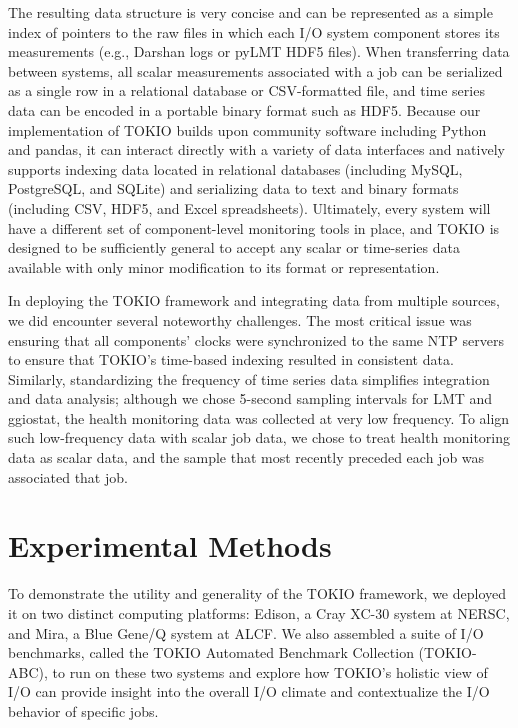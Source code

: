 The resulting data structure is very concise and can be represented as a simple index of pointers to the raw files in which each I/O system component stores its measurements (e.g., Darshan logs or pyLMT HDF5 files).
When transferring data between systems, all scalar measurements associated with a job can be serialized as a single row in a relational database or CSV-formatted file, and time series data can be encoded in a portable binary format such as HDF5.
Because our implementation of TOKIO builds upon community software including Python and pandas, it can interact directly with a variety of data interfaces and
natively supports indexing data located in relational databases (including MySQL, PostgreSQL, and SQLite) and serializing data to text and binary formats (including CSV, HDF5, and Excel spreadsheets).  Ultimately, every system will have a different set of component-level monitoring tools in place, and TOKIO is designed to be sufficiently general to accept any scalar or time-series data available with only minor modification to its format or representation.

In deploying the TOKIO framework and integrating data from multiple sources, we did encounter several noteworthy challenges.
The most critical issue was ensuring that all components' clocks were synchronized to the same NTP servers to ensure that TOKIO's time-based indexing resulted in consistent data.
Similarly, standardizing the frequency of time series data simplifies integration and data analysis; although we chose 5-second sampling intervals for LMT and ggiostat, the health monitoring data was collected at very low frequency.
To align such low-frequency data with scalar job data, we chose to treat health monitoring data as scalar data, and the sample that most recently preceded each job was associated that job.

\section{Experimental Methods} \label{sec:platforms}

To demonstrate the utility and generality of the TOKIO framework, we deployed it on two distinct computing platforms: Edison, a Cray XC-30 system at NERSC, and Mira, a Blue Gene/Q system at ALCF.
We also assembled a suite of I/O benchmarks, called the TOKIO Automated Benchmark Collection (TOKIO-ABC), to run on these two systems and explore how TOKIO's holistic view of I/O can provide insight into the overall I/O climate and contextualize the I/O behavior of specific jobs.

